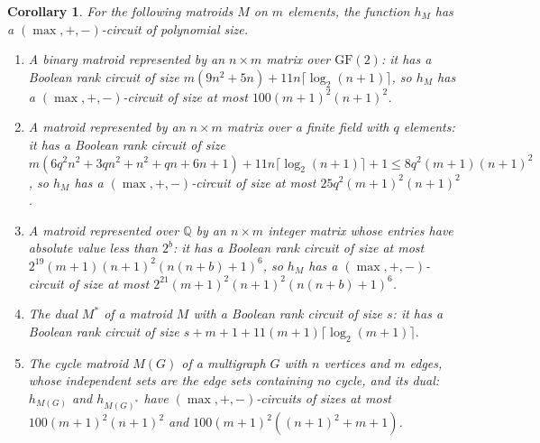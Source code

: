 \documentclass[11pt]{article}
\newtheorem{corollary}[theorem]{Corollary}
\begin{document}
\begin{corollary}
\label{cor:classes}
For the following matroids $M$ on $m$ elements, the function $h_M$ has a $(\max,+,-)$-circuit of polynomial size.
\begin{enumerate}
  \item A binary matroid represented by an $n\times m$ matrix over $\mathrm{GF}(2)$:
        it has a Boolean rank circuit of size
        $m(9n^{2}+5n)+11n\lceil\log_2(n+1)\rceil$, so $h_M$ has a $(\max,+,-)$-circuit of size at most $100(m+1)^{2}(n+1)^{2}$.
  \item A matroid represented by an $n\times m$ matrix over a finite field with $q$
        elements: it has a Boolean rank circuit of size
        $m(6q^{2}n^{2}+3qn^{2}+n^{2}+qn+6n+1)+11n\lceil\log_2(n+1)\rceil+1
        \le8q^{2}(m+1)(n+1)^{2}$, so $h_M$ has a $(\max,+,-)$-circuit of size at
        most $25q^{2}(m+1)^{2}(n+1)^{2}$.
  \item A matroid represented over $\mathbb Q$ by an $n\times m$ integer matrix whose
        entries have absolute value less than $2^{b}$: it has a Boolean rank circuit
        of size at most $2^{19}(m+1)(n+1)^{2}(n(n+b)+1)^{6}$, so $h_M$ has a $(\max,+,-)$-circuit of size at most $2^{21}(m+1)^{2}(n+1)^{2}(n(n+b)+1)^{6}$.
  \item The dual $M^{*}$ of a matroid $M$ with a Boolean rank circuit of size $s$:
        it has a Boolean rank circuit of size
        $s+m+1+11(m+1)\lceil\log_2(m+1)\rceil$.
  \item The cycle matroid $M(G)$ of a multigraph $G$ with $n$ vertices and $m$
        edges, whose independent sets are the edge sets containing no cycle, and its
        dual: $h_{M(G)}$ and $h_{M(G)^{*}}$ have $(\max,+,-)$-circuits of sizes at
        most $100(m+1)^{2}(n+1)^{2}$ and $100(m+1)^{2}((n+1)^{2}+m+1)$.
\end{enumerate}
\end{corollary}
\end{document}
